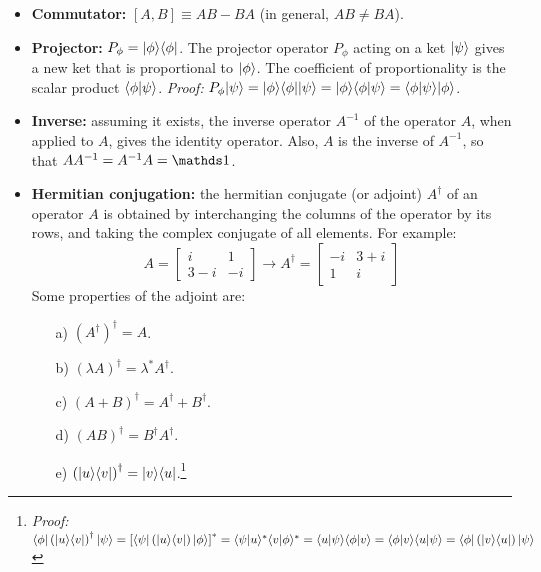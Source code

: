 \begin{itemize}
    \item \textbf{Commutator:} $[A, B] \equiv AB - BA$ (in general, $AB \neq BA$).
    \item \textbf{Projector:} $P_\phi = |\phi\rangle\langle\phi|$. The projector operator $P_\phi$ acting on a ket $|\psi\rangle$ gives a new ket that is proportional to $|\phi\rangle$. The coefficient of proportionality is the scalar product $\langle\phi|\psi\rangle$. \textit{Proof:} $P_\phi|\psi\rangle = |\phi\rangle\langle\phi||\psi\rangle = |\phi\rangle\langle\phi|\psi\rangle = \langle\phi|\psi\rangle|\phi\rangle$.
    \item \textbf{Inverse:} assuming it exists, the inverse operator $A^{-1}$ of the operator $A$, when applied to $A$, gives the identity operator. Also, $A$ is the inverse of $A^{-1}$, so that $AA^{-1} = A^{-1}A = \Imat$.
    \item \textbf{Hermitian conjugation:} the hermitian conjugate (or adjoint) $A^\dagger$ of an operator $A$ is obtained by interchanging the columns of the operator by its rows, and taking the complex conjugate of all elements. For example:
    \begin{equation}
        A = \begin{bmatrix}
            i & 1 \\
            3-i & -i
        \end{bmatrix}\rightarrow
        A^\dagger = \begin{bmatrix}
            -i & 3 + i \\
            1 & i
        \end{bmatrix}
    \end{equation}
    Some properties of the adjoint are:
    \begin{enumerate}
        \item[a)] $\left(A^\dagger\right)^\dagger = A$.
        \item[b)] $\left(\lambda A\right)^\dagger = \lambda^*A^\dagger$.
        \item[c)] $\left(A + B\right)^\dagger = A^\dagger + B^\dagger$.
        \item[d)] $\left(A B\right)^\dagger = B^\dagger A^\dagger$.
        \item [e)] $\left(|u\rangle\langle v|\right)^\dagger = |v\rangle\langle u|$.\footnote{\textit{Proof:} $\langle\phi|\left(|u\rangle\langle v|\right)^\dagger|\psi\rangle = \left[\langle\psi|\left(|u\rangle\langle v|\right)|\phi\rangle\right]^* = \langle\psi|u\rangle^*\langle v|\phi\rangle^* = \langle u|\psi\rangle\langle\phi|v\rangle = \langle\phi|v\rangle\langle u|\psi\rangle = \langle\phi|\left(|v\rangle\langle u|\right)|\psi\rangle$}

\end{enumerate}
\end{itemize}
